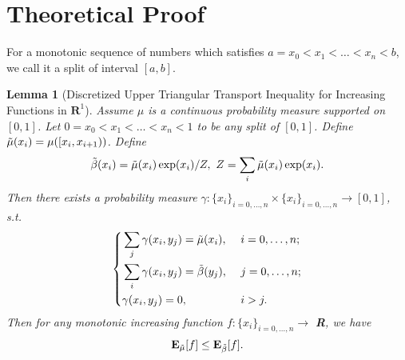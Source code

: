 \documentclass[nohyperref]{article}
\theoremstyle{plain}
\newtheorem{Lemma}{\textbf{Lemma}}
\begin{document}
\clearpage

\section{Theoretical Proof}
\label{App: proof}

For a monotonic sequence of numbers which satisfies $a = x_0 < x_1 < \dots < x_n < b$,
we call it a split of interval $[a, b]$.

\begin{Lemma}[Discretized Upper Triangular Transport Inequality for Increasing Functions in $\mathbf{R}^1$]
Assume $\mu$ is a continuous probability measure supported on $[0, 1]$. 
Let $0 = x_0 < x_1 < \dots < x_n < 1$ to be any split of $[0, 1]$.
Define $\Tilde{\mu}(x_i) = \mu([x_i, x_{i+1}))$. 
Define 
$$\Tilde{\beta}(x_i) = \Tilde{\mu}(x_i) \exp(x_i) / Z,\  Z = \sum_{i} \Tilde{\mu}(x_i) \exp (x_i).$$ 
Then there exists a probability measure $\gamma: \{x_i\}_{i=0,\dots, n} \times \{x_i\}_{i=0,\dots, n} \rightarrow [0, 1]$, s.t. 
\begin{equation}
    \left\{
    \begin{aligned}
        &\sum_j \gamma (x_i, y_j) = \Tilde{\mu} (x_i),& &\ i = 0, \dots, n; \\
        &\sum_i \gamma (x_i, y_j) = \Tilde{\beta} (y_j),& &\ j = 0, \dots, n; \\
        &\gamma (x_i, y_j) = 0,& &\ i > j. \\
    \end{aligned}
    \right.
\label{eq:UTTC_R1}
\end{equation}
Then for any monotonic increasing function $f:\{x_i\}_{i=0,\dots, n} \rightarrow $ \textbf{R},
we have
$$
\textbf{E}_{\Tilde{\mu}} [f] \leq \textbf{E}_{\Tilde{\beta}} [f].
$$
\label{lemma:dct_inc_R1}
\end{Lemma}
\end{document}

